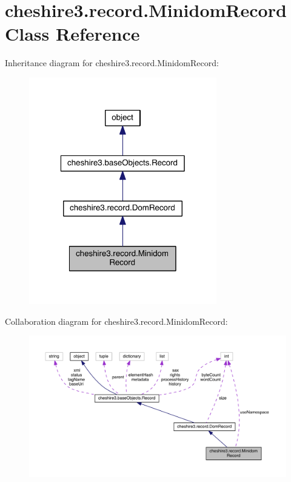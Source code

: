 \hypertarget{classcheshire3_1_1record_1_1_minidom_record}{\section{cheshire3.\-record.\-Minidom\-Record Class Reference}
\label{classcheshire3_1_1record_1_1_minidom_record}
}


Inheritance diagram for cheshire3.\-record.\-Minidom\-Record\-:
\nopagebreak
\begin{figure}[H]
\begin{center}
\leavevmode
\includegraphics[width=232pt]{classcheshire3_1_1record_1_1_minidom_record__inherit__graph}
\end{center}
\end{figure}


Collaboration diagram for cheshire3.\-record.\-Minidom\-Record\-:
\nopagebreak
\begin{figure}[H]
\begin{center}
\leavevmode
\includegraphics[width=350pt]{classcheshire3_1_1record_1_1_minidom_record__coll__graph}
\end{center}
\end{figure}
